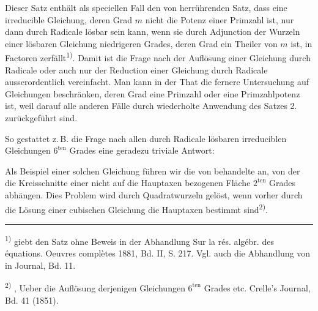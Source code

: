 
Dieser Satz enthält als speciellen Fall den von  herrührenden
Satz, dass eine irreducible Gleichung, deren Grad $m$ nicht die Potenz einer
Primzahl ist, nur dann durch Radicale lösbar sein kann, wenn sie durch
Adjunction der Wurzeln einer lösbaren Gleichung niedrigeren Grades, deren Grad
ein Theiler von $m$ ist, in Factoren zerfällt\textsuperscript{1)}. Damit ist die
Frage nach der Auflösung einer Gleichung durch Radicale oder auch nur der
Reduction einer Gleichung durch Radicale ausserordentlich vereinfacht. Man kann
in der That die fernere Untersuchung auf Gleichungen beschränken, deren Grad
eine Primzahl oder eine Primzahlpotenz ist, weil darauf alle anderen Fälle durch
wiederholte Anwendung des Satzes 2. zurückgeführt sind.

So gestattet z.\,B. die Frage nach allen durch Radicale lösbaren irreduciblen
Gleichungen $6^{\mathrm{ten}}$ Grades eine geradezu triviale Antwort:


Als Beispiel einer solchen Gleichung führen wir die von 
behandelte an, von der die Kreisschnitte einer nicht auf die Hauptaxen
bezogenen Fläche $2^{\mathrm{ten}}$ Grades abhängen. Dies Problem wird durch
Quadratwurzeln gelöst, wenn vorher durch die Lösung einer cubischen Gleichung
die Hauptaxen bestimmt sind\textsuperscript{2)}.

\noindent\rule{4cm}{0.4pt}\par
\textsuperscript{1)}  giebt den Satz ohne Beweis in der
Abhandlung \glqq Sur la rés. algébr. des équations\grqq{}. Oeuvres complètes
1881, Bd. II, S. 217. Vgl. auch die Abhandlung von  in
 Journal, Bd. 11.\par
\textsuperscript{2)} , \glqq Ueber die Auflösung derjenigen
Gleichungen $6^{\mathrm{ten}}$ Grades etc.\grqq{} Crelle's Journal, Bd. 41
(1851).
